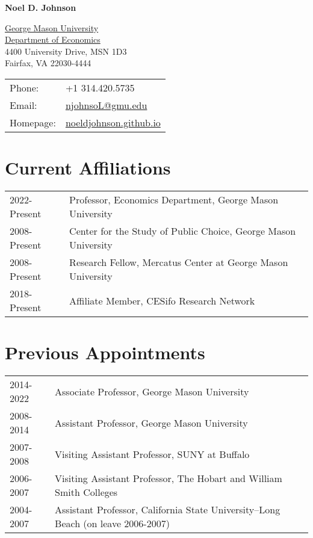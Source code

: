 \documentclass[11pt,fullpage]{article}
\def\name{Noel D. Johnson}
\begin{document}


\centerline{\Large \bf \name}

\vspace{0.25in}

\begin{minipage}{0.50\linewidth}
  \href{http://www.gmu.edu/}{George Mason University} \\
  \href{http://www.gmu.edu/centers/publicchoice/}{Department of Economics} \\
   4400 University Drive, MSN 1D3 \\
  Fairfax, VA 22030-4444
\end{minipage}
\begin{minipage}{0.50\linewidth}
  \begin{tabular}{ll}
    Phone: & +1 314.420.5735 \\
    Email: & \href{mailto:njohnsoL@gmu.edu}{njohnsoL@gmu.edu} \\
    Homepage: & \href{https://noeldjohnson.github.io}{noeldjohnson.github.io} \\
  \end{tabular}
\end{minipage}

\vspace{.25cm}


\section*{Current Affiliations}

\begin{tabular}{ll}
	2022-Present & Professor, Economics Department, George Mason University \\
	2008-Present & Center for the Study of Public Choice, George Mason University \\
	2008-Present & Research Fellow, Mercatus Center at George Mason University \\
	2018-Present & Affiliate Member, CESifo Research Network \\
\end{tabular}

\section*{Previous Appointments}

\begin{tabular}{ll}
	2014-2022 & Associate Professor, George Mason University \\
	2008-2014 & Assistant Professor, George Mason University \\
	2007-2008 & Visiting Assistant Professor, SUNY at Buffalo \\
	2006-2007 & Visiting Assistant Professor, The Hobart and William Smith Colleges \\
	2004-2007 & Assistant Professor, California State University--Long Beach (on leave 2006-2007) \\
\end{tabular}
\end{document}
